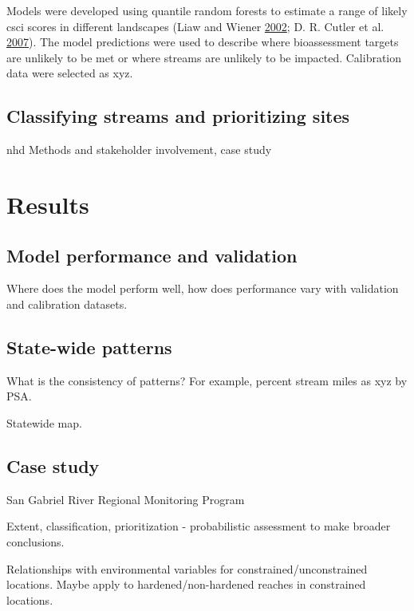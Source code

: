 \documentclass[]{article}
\begin{document}
Models were developed using quantile random forests to estimate a range
of likely \ac{csci} scores in different landscapes (Liaw and Wiener
\protect\hyperlink{ref-Liaw02}{2002}; D. R. Cutler et al.
\protect\hyperlink{ref-Cutler07}{2007}). The model predictions were used
to describe where bioassessment targets are unlikely to be met or where
streams are unlikely to be impacted. Calibration data were selected as
xyz.

\subsection{Classifying streams and prioritizing
sites}\label{classifying-streams-and-prioritizing-sites}

\ac{nhd} Methods and stakeholder involvement, case study

\section{Results}\label{results}

\subsection{Model performance and
validation}\label{model-performance-and-validation}

Where does the model perform well, how does performance vary with
validation and calibration datasets.

\subsection{State-wide patterns}\label{state-wide-patterns}

What is the consistency of patterns? For example, percent stream miles
as xyz by PSA.

Statewide map.

\subsection{Case study}\label{case-study}

San Gabriel River Regional Monitoring Program

Extent, classification, prioritization - probabilistic assessment to
make broader conclusions.

Relationships with environmental variables for constrained/unconstrained
locations. Maybe apply to hardened/non-hardened reaches in constrained
locations.
\end{document}
